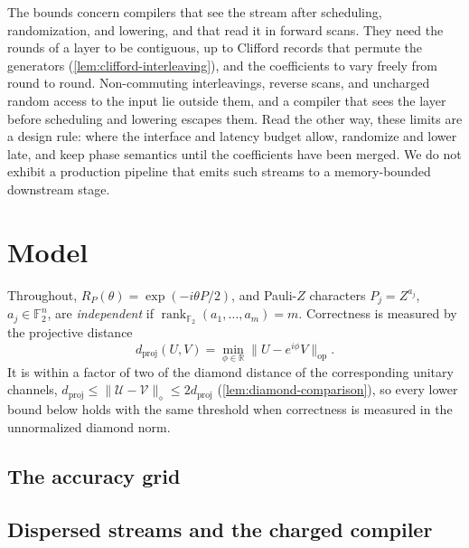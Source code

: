 \documentclass[aps,prx,reprint,superscriptaddress,floatfix,longbibliography]{revtex4-2}
\begin{document}
The bounds concern compilers that see the stream after scheduling,
randomization, and lowering, and that read it in forward scans.  They need
the rounds of a layer to be contiguous, up to Clifford records that
permute the generators (\cref{lem:clifford-interleaving}), and the
coefficients to vary freely from round to round.  Non-commuting
interleavings, reverse scans, and uncharged random access to the input lie
outside them, and a compiler that sees the layer before scheduling and
lowering escapes them.  Read the other way, these limits are a design
rule: where the interface and latency budget allow, randomize and lower
late, and keep phase semantics until the coefficients have been merged.
We do not exhibit a production pipeline that emits such streams to a
memory-bounded downstream stage.

\section{Model}
\label{sec:setup}
\label{sec:framework}

Throughout, $R_P(\theta)=\exp(-i\theta P/2)$, and Pauli-$Z$ characters
$P_j=Z^{a_j}$, $a_j\in\mathbb F_2^n$, are \emph{independent} if
$\operatorname{rank}_{\mathbb F_2}(a_1,\ldots,a_m)=m$.  Correctness is
measured by the projective distance
\begin{equation}
\label{eq:proj-norm}
 d_{\mathrm{proj}}(U,V)=\min_{\phi\in\mathbb R}\|U-e^{i\phi}V\|_{\mathrm{op}}.
\end{equation}
It is within a factor of two of the diamond distance of the corresponding
unitary channels, $d_{\mathrm{proj}}\leq\|\mathcal U-\mathcal V\|_\diamond
\leq2d_{\mathrm{proj}}$ (\cref{lem:diamond-comparison}), so every lower
bound below holds with the same threshold when correctness is measured in
the unnormalized diamond norm.

\subsection{The accuracy grid}
\label{sec:w1-qary-packing}



\subsection{Dispersed streams and the charged compiler}
\label{sec:w1-dispersed}


\end{document}
